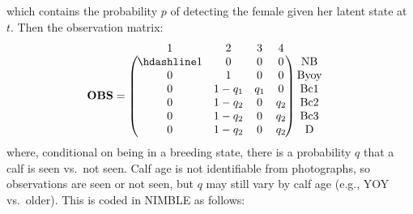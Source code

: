 \documentclass[
  12pt,
]{krantz}
\begin{document}
which contains the probability \(p\) of detecting the female given her latent state at \(t\). Then the observation matrix:
\[
\begin{matrix}
& \\
\mathbf{OBS} =
\left ( \vphantom{ \begin{matrix} 12 \\ 12 \\ 12 \\ 12 \\ 12 \\ 12 \end{matrix} } \right .
\end{matrix}
\hspace{-1.2em}
\begin{matrix}
1 & 2 & 3 & 4 \\ \hdashline
1 & 0 & 0 & 0 \\
0 & 1 & 0 & 0 \\
0 & 1 - q_1 & q_1 & 0 \\
0 & 1 - q_2 & 0 & q_2 \\
0 & 1 - q_2 & 0 & q_2 \\
0 & 1 - q_2 & 0 & q_2
\end{matrix}
\hspace{-0.2em}
\begin{matrix}
& \\
\left . \vphantom{ \begin{matrix} 12 \\ 12 \\ 12 \\ 12 \\ 12 \\ 12 \end{matrix} } \right )
\begin{matrix}
\text{NB} \\
\text{Byoy} \\
\text{Bc1} \\
\text{Bc2} \\
\text{Bc3} \\
\text{D}
\end{matrix}
\end{matrix}
\]
where, conditional on being in a breeding state, there is a probability \(q\) that a calf is seen vs.~not seen. Calf age is not identifiable from photographs, so observations are seen or not seen, but \(q\) may still vary by calf age (e.g., YOY vs.~older). This is coded in NIMBLE as follows:
\end{document}
